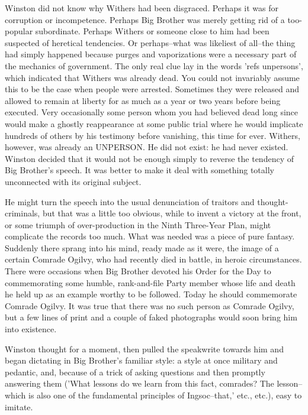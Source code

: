 \documentclass{article}
\begin{document}
Winston did not know why Withers had been disgraced. Perhaps it was for
corruption or incompetence. Perhaps Big Brother was merely getting rid of
a too-popular subordinate. Perhaps Withers or someone close to him had
been suspected of heretical tendencies. Or perhaps--what was likeliest of
all--the thing had simply happened because purges and vaporizations were a
necessary part of the mechanics of government. The only real clue lay in
the words 'refs unpersons', which indicated that Withers was already dead.
You could not invariably assume this to be the case when people were
arrested. Sometimes they were released and allowed to remain at liberty
for as much as a year or two years before being executed. Very occasionally
some person whom you had believed dead long since would make a ghostly
reappearance at some public trial where he would implicate hundreds of
others by his testimony before vanishing, this time for ever. Withers,
however, was already an UNPERSON. He did not exist: he had never existed.
Winston decided that it would not be enough simply to reverse the tendency
of Big Brother's speech. It was better to make it deal with something
totally unconnected with its original subject.

He might turn the speech into the usual denunciation of traitors and
thought-criminals, but that was a little too obvious, while to invent a
victory at the front, or some triumph of over-production in the Ninth
Three-Year Plan, might complicate the records too much. What was needed
was a piece of pure fantasy. Suddenly there sprang into his mind, ready
made as it were, the image of a certain Comrade Ogilvy, who had recently
died in battle, in heroic circumstances. There were occasions when Big
Brother devoted his Order for the Day to commemorating some humble,
rank-and-file Party member whose life and death he held up as an example
worthy to be followed. Today he should commemorate Comrade Ogilvy. It was
true that there was no such person as Comrade Ogilvy, but a few lines of
print and a couple of faked photographs would soon bring him into
existence.

Winston thought for a moment, then pulled the speakwrite towards him and
began dictating in Big Brother's familiar style: a style at once military
and pedantic, and, because of a trick of asking questions and then
promptly answering them ('What lessons do we learn from this fact,
comrades? The lesson--which is also one of the fundamental principles
of Ingsoc--that,' etc., etc.), easy to imitate.
\end{document}
